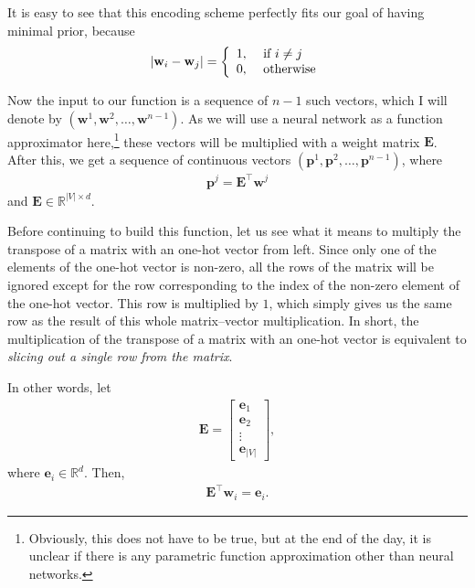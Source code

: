 \documentclass{report}
\newcommand{\vect}[1]{\mathbf{#1}}
\newcommand{\matr}[1]{\mathbf{#1}}
\newcommand{\ve}[0]{\vect{e}}
\newcommand{\vp}[0]{\vect{p}}
\newcommand{\vw}[0]{\vect{w}}
\newcommand{\mE}[0]{\matr{E}}
\newcommand{\RR}[0]{\mathbb{R}}
\begin{document}
It is easy to see that this encoding scheme perfectly fits our goal of having
minimal prior, because
\begin{align*}
    |\vw_i - \vw_j| = \left\{
        \begin{array}{l l}
            1,&\text{ if }i\neq j \\
            0,&\text{ otherwise}
        \end{array}
        \right.
\end{align*}

Now the input to our function is a sequence of $n-1$ such vectors, which I will
denote by $(\vw^1, \vw^2, \ldots, \vw^{n-1})$. As we will use a neural network
as a function approximator here,\footnote{
    Obviously, this does not have to be true, but at the end of the day, it is
    unclear if there is any parametric function approximation other than neural
    networks.
} 
these vectors will be multiplied with a weight matrix $\mE$. After this, we get
a sequence of continuous vectors $(\vp^1, \vp^2, \ldots, \vp^{n-1})$, where
\begin{align}
    \label{eq:nlm_first_layer}
    \vp^j = \mE^\top \vw^j
\end{align}
and $\mE \in \RR^{|V| \times d}$. 

Before continuing to build this function, let us see what it means to multiply
the transpose of a matrix with an one-hot vector from left. Since only one of
the elements of the one-hot vector is non-zero, all the rows of the matrix will
be ignored except for the row corresponding to the index of the non-zero element
of the one-hot vector. This row is multiplied by $1$, which simply gives us the
same row as the result of this whole matrix--vector multiplication. In short,
the multiplication of the transpose of a matrix with an one-hot vector is
equivalent to {\em slicing out a single row from the matrix}.

In other words, let 
\begin{align}
    \label{eq:word_emb}
    \mE = \left[ 
        \begin{array}{l}
            \ve_1 \\
            \ve_2 \\
            \vdots \\
            \ve_{|V|}
        \end{array}
    \right],
\end{align}
where $\ve_i \in \RR^d$. Then,
\begin{align*}
    \mE^\top \vw_i = \ve_i.
\end{align*}
\end{document}
